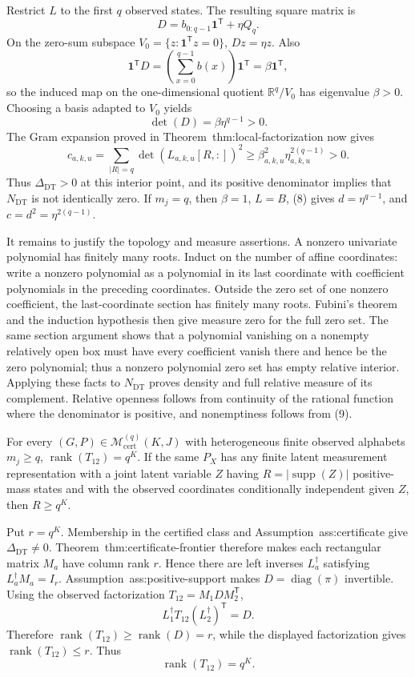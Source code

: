 Restrict \(L\) to the first \(q\) observed states.  The resulting square matrix is
\[
 D=b_{0:q-1}\mathbf1^{\mathsf T}+\eta Q_q.
\]
On the zero-sum subspace \(V_0=\{z:\mathbf1^{\mathsf T}z=0\}\), \(Dz=\eta z\).  Also
\[
 \mathbf1^{\mathsf T}D
 =\left(\sum_{x=0}^{q-1}b(x)\right)\mathbf1^{\mathsf T}
 =\beta\mathbf1^{\mathsf T},
\]
so the induced map on the one-dimensional quotient \(\mathbb R^q/V_0\) has eigenvalue \(\beta>0\).  Choosing a basis adapted to \(V_0\) yields
\[
 \det(D)=\beta\eta^{q-1}>0.
\tag{8}
\]
The Gram expansion proved in Theorem~\textnormal{thm:local-factorization} now gives
\[
 c_{a,k,u}
 =\sum_{|R|=q}\det(L_{a,k,u}[R,:])^2
 \ge \beta_{a,k,u}^2\eta_{a,k,u}^{2(q-1)}>0.
\tag{9}
\]
Thus \(\Delta_{\mathrm{DT}}>0\) at this interior point, and its positive denominator implies that \(N_{\mathrm{DT}}\) is not identically zero.  If \(m_j=q\), then \(\beta=1\), \(L=B\), (8) gives \(d=\eta^{q-1}\), and \(c=d^2=\eta^{2(q-1)}\).

It remains to justify the topology and measure assertions.  A nonzero univariate polynomial has finitely many roots.  Induct on the number of affine coordinates: write a nonzero polynomial as a polynomial in its last coordinate with coefficient polynomials in the preceding coordinates.  Outside the zero set of one nonzero coefficient, the last-coordinate section has finitely many roots.  Fubini's theorem and the induction hypothesis then give measure zero for the full zero set.  The same section argument shows that a polynomial vanishing on a nonempty relatively open box must have every coefficient vanish there and hence be the zero polynomial; thus a nonzero polynomial zero set has empty relative interior.  Applying these facts to \(N_{\mathrm{DT}}\) proves density and full relative measure of its complement.  Relative openness follows from continuity of the rational function where the denominator is positive, and nonemptiness follows from (9).

For every \((G,P)\in\mathcal M_{\mathrm{cert}}^{(q)}(K,J)\) with heterogeneous finite observed alphabets \(m_j\ge q\), \(\operatorname{rank}(T_{12})=q^K\).  If the same \(P_X\) has any finite latent measurement representation with a joint latent variable \(Z\) having \(R=|\operatorname{supp}(Z)|\) positive-mass states and with the observed coordinates conditionally independent given \(Z\), then \(R\ge q^K\).

Put \(r=q^K\).  Membership in the certified class and Assumption~\textnormal{ass:certificate} give \(\Delta_{\mathrm{DT}}\neq0\).  Theorem~\textnormal{thm:certificate-frontier} therefore makes each rectangular matrix \(M_a\) have column rank \(r\).  Hence there are left inverses \(L_a^{\dagger}\) satisfying \(L_a^{\dagger}M_a=I_r\).  Assumption~\textnormal{ass:positive-support} makes \(D=\operatorname{diag}(\pi)\) invertible.  Using the observed factorization \(T_{12}=M_1DM_2^{\mathsf T}\),
\[
 L_1^{\dagger}T_{12}(L_2^{\dagger})^{\mathsf T}=D.
\]
Therefore \(\operatorname{rank}(T_{12})\ge\operatorname{rank}(D)=r\), while the displayed factorization gives \(\operatorname{rank}(T_{12})\le r\).  Thus
\[
 \operatorname{rank}(T_{12})=q^K.
\tag{10}
\]


